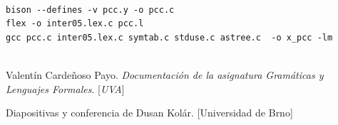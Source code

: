 \documentclass[11pt]{article}
\begin{document}
\begin{verbatim}

bison --defines -v pcc.y -o pcc.c
flex -o inter05.lex.c pcc.l
gcc pcc.c inter05.lex.c symtab.c stduse.c astree.c  -o x_pcc -lm


\end{verbatim}

\bigskip
\begin{thebibliography}{9}

Valentín Cardeñoso Payo. \textit{Documentación de la asignatura Gramáticas y Lenguajes Formales}. [\textit{UVA}]
 
Diapositivas y conferencia de Dusan Kolár. [Universidad de Brno]


\end{thebibliography}
\end{document}
